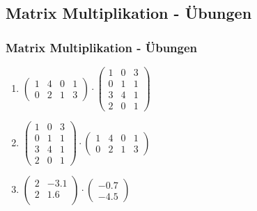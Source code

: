 \subsection{Matrix Multiplikation - Übungen}
\begin{frame}
\frametitle{Matrix Multiplikation - Übungen}
\begin{enumerate}
\item $ \begin{pmatrix} 
1 & 4 & 0 & 1\\ 
0 & 2 & 1 & 3 
\end{pmatrix} 
\cdot 
\begin{pmatrix} 
1 & 0 & 3 \\ 
0 & 1 & 1\\
3 & 4 & 1\\
2 & 0 & 1
\end{pmatrix} $
\item 
$\begin{pmatrix} 
1 & 0 & 3 \\ 
0 & 1 & 1\\
3 & 4 & 1\\
2 & 0 & 1
\end{pmatrix} 
\cdot 
\begin{pmatrix} 
1 & 4 & 0 & 1\\ 
0 & 2 & 1 & 3 
\end{pmatrix} $
\item
$\begin{pmatrix}
2 & -3.1 \\
2 & 1.6 \\
\end{pmatrix}
\cdot
\begin{pmatrix}
-0.7 \\
-4.5 
\end{pmatrix}$
\end{enumerate}
\end{frame}

